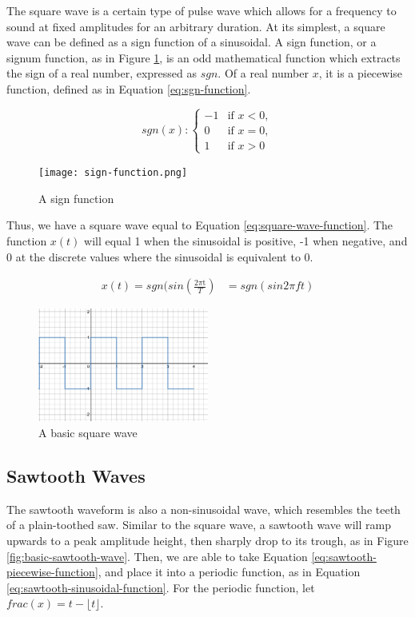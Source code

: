 The square wave is a certain type of pulse wave which allows for a frequency to sound at fixed amplitudes for an arbitrary duration. At its simplest, a square wave can be defined as a sign function of a sinusoidal. A sign function, or a signum function, as in Figure \ref{fig:sign-function}, is an odd mathematical function which extracts the sign of a real number, expressed as $sgn$. Of a real number $x$, it is a piecewise function, defined as in Equation \ref{eq:sgn-function}.

\begin{equation}
	sgn (x): \begin{cases}
		-1 & \textrm{if } x < 0, \\
		0 & \textrm{if } x = 0, \\
		1 & \textrm{if } x > 0
	\end{cases}
	\label{eq:sgn-function}
\end{equation}

\begin{figure}
  \centering
  \texttt{[image: sign-function.png]}
  \caption{A sign function}
  \label{fig:sign-function}
\end{figure}

Thus, we have a square wave equal to Equation \ref{eq:square-wave-function}. The function $x(t)$ will equal 1 when the sinusoidal is positive, -1 when negative, and 0 at the discrete values where the sinusoidal is equivalent to 0.

\begin{align}
	x(t) = sgn(sin(\frac{2\pi\textrm{t}}{T}) &
	= sgn(sin2\pi ft)
	\label{eq:square-wave-function}
\end{align} %


\begin{figure}
  \centering
  \includegraphics[width=0.5\textwidth]{figures/square-wave.png}
  \caption{A basic square wave}
  \label{fig:square-wave}
\end{figure}

\subsection{Sawtooth Waves}
The sawtooth waveform is also a non-sinusoidal wave, which resembles the teeth of a plain-toothed saw. Similar to the square wave, a sawtooth wave will ramp upwards to a peak amplitude height, then sharply drop to its trough, as in Figure \ref{fig:basic-sawtooth-wave}. Then, we are able to take Equation \ref{eq:sawtooth-piecewise-function}, and place it into a periodic function, as in Equation \ref{eq:sawtooth-sinusoidal-function}. For the periodic function, let $frac(x) = t - \lfloor t \rfloor$.

